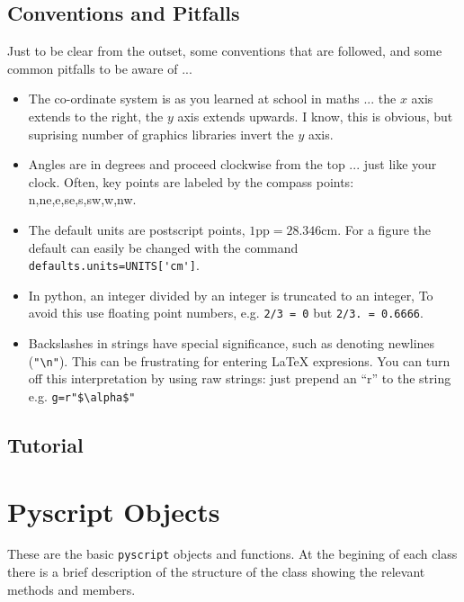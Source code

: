 \documentclass[a4paper]{book}
\begin{document}
\section{Conventions and Pitfalls}
\label{sec:conventions}

Just to be clear from the outset, some conventions that are followed, and 
some common pitfalls to be aware of ...

\begin{itemize}
\item The co-ordinate system is as you learned at school in maths ...
  the $x$ axis extends to the right, the $y$ axis extends upwards. I know, this is
  obvious, but suprising number of graphics libraries invert the $y$ axis.
\item Angles are in degrees and proceed clockwise from the top ...
  just like your clock. Often, key points are labeled by the compass
  points: n,ne,e,se,s,sw,w,nw.
\item The default units are postscript points,
  $1\mathrm{pp}=28.346\mathrm{cm}$. For a figure the default can
  easily be changed with the command
  \Verb|defaults.units=UNITS['cm']|.
\item In python, an integer divided by an integer is truncated to an
  integer, To avoid this use floating point numbers, e.g. \Verb|2/3 = 0|
  but \Verb|2/3. = 0.6666|.
\item Backslashes in strings have special significance, such as
  denoting newlines (\Verb|"\n"|). This can be frustrating for
  entering \LaTeX{} expresions. You can turn off this interpretation by
  using raw strings: just prepend an ``r'' to the string e.g.
  \Verb|g=r"$\alpha$"|
\end{itemize}


\section{Tutorial}
\label{sec:tutotial}


\chapter{Pyscript Objects}
\label{cha:base-objects}

These are the basic \Verb|pyscript| objects and functions. At the begining
of each class there is a brief description of the structure of the class
showing the relevant methods and members.
\end{document}
